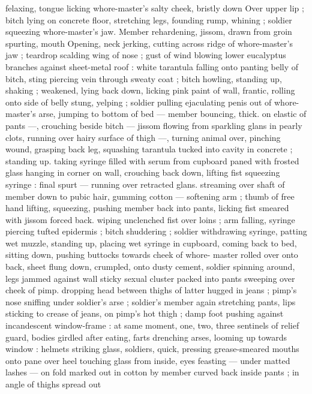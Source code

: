 felaxing, tongue licking whore-master's salty cheek, bristly down 
Over upper lip ; bitch lying on concrete floor, stretching legs, 
founding rump, whining ; soldier squeezing whore-master's jaw. 
Member rehardening, jissom, drawn from groin spurting, mouth 
Opening, neck jerking, cutting across ridge of whore-master's jaw ; 
teardrop scalding wing of nose ; gust of wind blowing lower 
eucalyptus branches against sheet-metal roof : white tarantula 
falling onto panting belly of bitch, sting piercing vein through sweaty 
coat ; bitch howling, standing up, shaking ; weakened, lying back 
down, licking pink paint of wall, frantic, rolling onto side of belly 
stung, yelping ; soldier pulling ejaculating penis out of whore- 
master's arse, jumping to bottom of bed --- member bouncing, thick. 
on elastic of pants ---, crouching beside bitch --- jissom flowing from 
sparkling glans in pearly clots, running over hairy surface of thigh 
---, turning animal over, pinching wound, grasping back leg, 
squashing tarantula tucked into cavity in concrete ; standing up. 
taking syringe filled with serum from cupboard paned with frosted 
glass hanging in corner on wall, crouching back down, lifting fist 
squeezing syringe : final spurt --- running over retracted glans. 
streaming over shaft of member down to pubic hair, gumming cotton 
--- softening arm ; thumb of free hand lifting, squeezing, pushing 
member back into pants, licking fist smeared with jissom forced back. 
wiping unclenched fist over loins ; arm falling, syringe piercing tufted 
epidermis ; bitch shuddering ; soldier withdrawing syringe, patting 
wet muzzle, standing up, placing wet syringe in cupboard, coming 
back to bed, sitting down, pushing buttocks towards cheek of whore- 
master rolled over onto back, sheet flung down, crumpled, onto 
dusty cement, soldier spinning around, legs jammed against wall 
sticky sexual cluster packed into pants sweeping over cheek of pimp. 
dropping head between thighs of latter hugged in jeans ; pimp's 
nose sniffing under soldier's arse ; soldier's member again 
stretching pants, lips sticking to crease of jeans, on pimp's hot thigh 
; damp foot pushing against incandescent window-frame : at same 
moment, one, two, three sentinels of relief guard, bodies girdled 
after eating, farts drenching arses, looming up towards window : 
helmets striking glass, soldiers, quick, pressing grease-smeared 
mouths onto pane over heel touching glass from inside, eyes 
feasting --- under matted lashes --- on fold marked out in cotton by 
member curved back inside pants ; in angle of thighs spread out 

